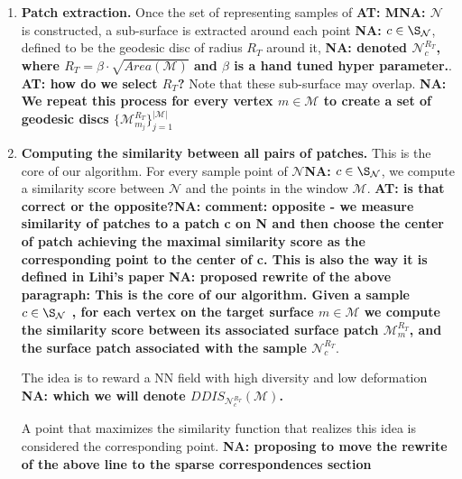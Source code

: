 \documentclass[10pt,twocolumn,letterpaper]{article}
\newcommand{\colornote}[3]{{\color{#1}\bf{#2: #3}\normalfont}}
\newcommand{\colornote}[3]{}
\newcommand {\ayellet}[1]{\colornote{blue}{AT}{#1}}
\newcommand {\nadav}[1]{\colornote{red}{NA}{#1}}
\begin{document}
\begin{enumerate}
    \item
    {\bf Patch extraction.} 
    Once the set of representing samples of \ayellet{M}\nadav{$\mathcal{N}$} is constructed, a sub-surface is extracted around each point \nadav{$c\in\S_{\mathcal{N}}$}, defined to be the geodesic disc of radius $R_T$ around it, \nadav{ denoted ${\mathcal{N}^{R_T}_{c}}$, where $R_T=\beta\cdot\sqrt{Area(\mathcal{M})}$ and $\beta$ is a hand tuned hyper parameter.}.
    \ayellet{how do we select $R_T$?}
    Note that these sub-surface may overlap.
    \nadav{We repeat this process for every vertex $m\in\mathcal{M}$ to create a set of geodesic discs $\{{\mathcal{M}_{m_j}^{R_T}}\}_{j=1}^{|\mathcal{M}|}$}
    
    \item
    {\bf Computing the similarity between all pairs of patches.} 
    This is the core of our algorithm.
    For every sample point of $\mathcal{N}$\nadav{$c\in\S_\mathcal{N}$}, we
    compute a similarity score between $\mathcal{N}$ and the points in the window $\mathcal{M}$.
    \ayellet{is that correct or the opposite?}\nadav{comment: opposite - we measure similarity of patches to a patch c on N and then choose the center of patch achieving the maximal similarity score as the corresponding point to the center of c. This is also the way it is defined in Lihi's paper} 
    \nadav{proposed rewrite of the above paragraph: 
    This is the core of our algorithm.
    Given a sample $c\in\S_\mathcal{N}$ , for each vertex on the target surface $m\in\mathcal{M}$ we compute the similarity score between its associated surface patch ${\mathcal{M}^{R_T}_{m}}$, and the surface patch associated with the sample ${\mathcal{N}^{R_T}_{c}}$}.

    
    The idea is to reward a NN field with high diversity and low deformation \nadav{which we will denote $DDIS_{\mathcal{N}^{R_T}_{c}}(\mathcal{M})$.} %
    
    
    A point that maximizes the similarity function that realizes this idea is considered the corresponding point.
    \nadav{proposing to move the rewrite of the above line to the sparse correspondences section}
    

\end{enumerate}
\end{document}
